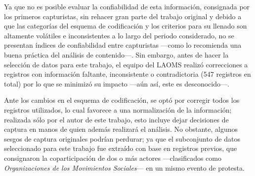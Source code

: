 \documentclass[letterpaper, 11pt]{book}
\theoremstyle{definition}
\theoremstyle{remark}
\begin{document}
Ya que no es posible evaluar la confiabilidad de esta información, consignada por los primeros capturistas, sin rehacer gran parte del trabajo original y debido a que las categorías del esquema de codificación y los criterios para su llenado son altamente volátiles e inconsistentes a lo largo del periodo considerado, no se presentan índices de confiabilidad entre capturistas ---como lo recomienda una buena práctica del análisis de contenido---. 
Sin embargo, antes de hacer la selección de datos para este trabajo, el equipo del LAOMS realizó correcciones a registros con información faltante, inconsistente o contradictoria (547 registros en total) por lo que se minimizó su impacto ---aún así, este es desconocido---. 

Ante los cambios en el esquema de codificación, se optó por corregir todos los registros utilizados, lo cual favorece a una normalización de la información; realizada sólo por el autor de este trabajo, esto incluye dejar decisiones de captura en manos de quien además realizará el análisis. 
No obstante, algunos sesgos de captura originales podrían perdurar; ya que el subconjunto de datos seleccionado para este trabajo fue extraído con base en registros previos, que consignaron la coparticipación de dos o más actores ---clasificados como \emph{Organizaciones de los Movimientos Sociales}--- en un mismo evento de protesta.
\end{document}
